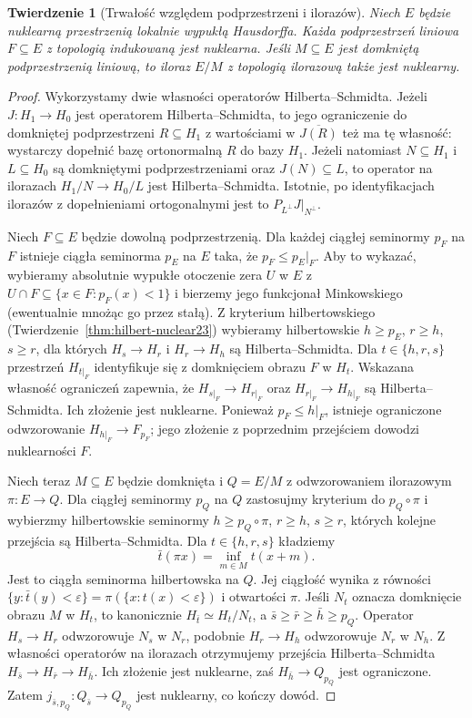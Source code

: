 \documentclass[11pt,a4paper]{article}
\numberwithin{equation}{section}
\theoremstyle{plain}
\newtheorem{twierdzenie}{Twierdzenie}[section]
\theoremstyle{definition}
\theoremstyle{remark}
\begin{document}
\begin{twierdzenie}[Trwałość względem podprzestrzeni i ilorazów]
\label{thm:nuclear-subquot23}
Niech $E$ będzie nuklearną przestrzenią lokalnie wypukłą
Hausdorffa. Każda podprzestrzeń liniowa $F\subseteq E$
z topologią indukowaną jest nuklearna. Jeśli $M\subseteq E$
jest domkniętą podprzestrzenią liniową, to iloraz $E/M$
z topologią ilorazową także jest nuklearny.
\end{twierdzenie}
\begin{proof}
Wykorzystamy dwie własności operatorów Hilberta--Schmidta.
Jeżeli $J:H_1\to H_0$ jest operatorem Hilberta--Schmidta,
to jego ograniczenie do domkniętej podprzestrzeni $R\subseteq H_1$
z wartościami w $\overline{J(R)}$ też ma tę własność:
wystarczy dopełnić bazę ortonormalną $R$ do bazy $H_1$.
Jeżeli natomiast $N\subseteq H_1$ i $L\subseteq H_0$
są domkniętymi podprzestrzeniami oraz $J(N)\subseteq L$,
to operator na ilorazach $H_1/N\to H_0/L$ jest
Hilberta--Schmidta. Istotnie, po identyfikacjach ilorazów
z dopełnieniami ortogonalnymi jest to
$P_{L^\perp}J|_{N^\perp}$.

Niech $F\subseteq E$ będzie dowolną podprzestrzenią.
Dla każdej ciągłej seminormy $p_F$ na $F$ istnieje
ciągła seminorma $p_E$ na $E$ taka, że
$p_F\le p_E|_F$. Aby to wykazać, wybieramy absolutnie
wypukłe otoczenie zera $U$ w $E$ z
$U\cap F\subseteq\{x\in F:p_F(x)<1\}$ i bierzemy
jego funkcjonał Minkowskiego (ewentualnie mnożąc go
przez stałą). Z kryterium hilbertowskiego
(Twierdzenie~\ref{thm:hilbert-nuclear23}) wybieramy
hilbertowskie $h\ge p_E$, $r\ge h$, $s\ge r$,
dla których $H_s\to H_r$ i $H_r\to H_h$ są
Hilberta--Schmidta. Dla $t\in\{h,r,s\}$ przestrzeń
$H_{t|_F}$ identyfikuje się z domknięciem obrazu $F$
w $H_t$. Wskazana własność ograniczeń zapewnia,
że $H_{s|_F}\to H_{r|_F}$ oraz
$H_{r|_F}\to H_{h|_F}$ są Hilberta--Schmidta.
Ich złożenie jest nuklearne. Ponieważ
$p_F\le h|_F$, istnieje ograniczone odwzorowanie
$H_{h|_F}\to F_{p_F}$; jego złożenie z poprzednim
przejściem dowodzi nuklearności $F$.

Niech teraz $M\subseteq E$ będzie domknięta i
$Q=E/M$ z odwzorowaniem ilorazowym $\pi:E\to Q$.
Dla ciągłej seminormy $p_Q$ na $Q$ zastosujmy kryterium
do $p_Q\circ\pi$ i wybierzmy hilbertowskie seminormy
$h\ge p_Q\circ\pi$, $r\ge h$, $s\ge r$,
których kolejne przejścia są Hilberta--Schmidta.
Dla $t\in\{h,r,s\}$ kładziemy
\[
 \bar t(\pi x)=\inf_{m\in M}t(x+m).
\]
Jest to ciągła seminorma hilbertowska na $Q$.
Jej ciągłość wynika z równości
$\{y:\bar t(y)<\varepsilon\}=
\pi(\{x:t(x)<\varepsilon\})$ i otwartości $\pi$.
Jeśli $N_t$ oznacza domknięcie obrazu $M$ w $H_t$,
to kanonicznie $H_{\bar t}\simeq H_t/N_t$, a
$\bar s\ge\bar r\ge\bar h\ge p_Q$.
Operator $H_s\to H_r$ odwzorowuje $N_s$ w $N_r$,
podobnie $H_r\to H_h$ odwzorowuje $N_r$ w $N_h$.
Z własności operatorów na ilorazach otrzymujemy
przejścia Hilberta--Schmidta
$H_{\bar s}\to H_{\bar r}\to H_{\bar h}$.
Ich złożenie jest nuklearne, zaś
$H_{\bar h}\to Q_{p_Q}$ jest ograniczone. Zatem
$j_{\bar s,p_Q}:Q_{\bar s}\to Q_{p_Q}$ jest nuklearny,
co kończy dowód.
\end{proof}
\end{document}
